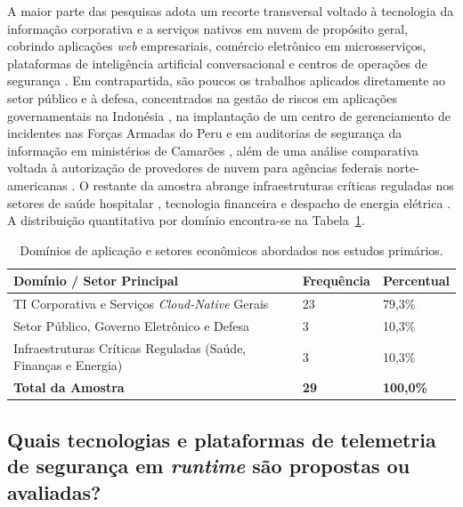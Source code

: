A maior parte das pesquisas adota um recorte transversal voltado à tecnologia da informação corporativa e a serviços nativos em nuvem de propósito geral, cobrindo aplicações \textit{web} empresariais, comércio eletrônico em microsserviços, plataformas de inteligência artificial conversacional e centros de operações de segurança \cite{devarajulu2025,aftab2026,albuquerque2024,sushma2025,bungei2026}. Em contrapartida, são poucos os trabalhos aplicados diretamente ao setor público e à defesa, concentrados na gestão de riscos em aplicações governamentais na Indonésia \cite{sasmito2025}, na implantação de um centro de gerenciamento de incidentes nas Forças Armadas do Peru \cite{acosta2025} e em auditorias de segurança da informação em ministérios de Camarões \cite{enaw2018}, além de uma análise comparativa voltada à autorização de provedores de nuvem para agências federais norte-americanas \cite{giulio2017}. O restante da amostra abrange infraestruturas críticas reguladas nos setores de saúde hospitalar \cite{coutinho2023}, tecnologia financeira \cite{mahida2026} e despacho de energia elétrica \cite{xu2025}. A distribuição quantitativa por domínio encontra-se na Tabela~\ref{tab:rsl_qs02}.

\begin{table}[!htbp]
    \centering
    \caption{Domínios de aplicação e setores econômicos abordados nos estudos primários.}
    \label{tab:rsl_qs02}
    \footnotesize
    \begin{tabular}{p{9.8cm}p{2.2cm}p{2.0cm}}
        \hline
        \textbf{Domínio / Setor Principal} & \textbf{Frequência} & \textbf{Percentual} \\ \hline
        TI Corporativa e Serviços \textit{Cloud-Native} Gerais & 23 & 79,3\% \\ \hline
        Setor Público, Governo Eletrônico e Defesa & 3 & 10,3\% \\ \hline
        Infraestruturas Críticas Reguladas (Saúde, Finanças e Energia) & 3 & 10,3\% \\ \hline
        \textbf{Total da Amostra} & \textbf{29} & \textbf{100,0\%} \\ \hline
    \end{tabular}
\end{table}
\FloatBarrier

\subsection{Quais tecnologias e plataformas de telemetria de segurança em \textit{runtime} são propostas ou avaliadas?}
\label{subsec:rsl_qs03}

